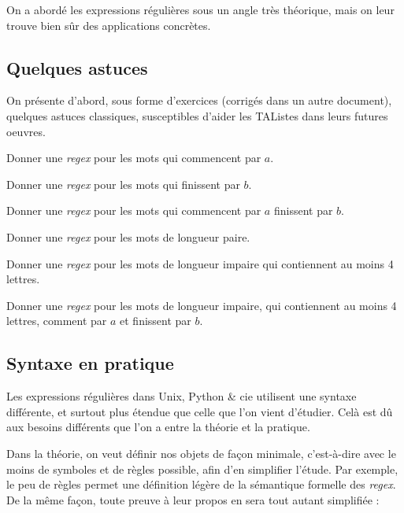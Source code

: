On a abordé les expressions régulières sous un angle très théorique, mais on leur trouve bien sûr des applications concrètes.

\subsection{Quelques astuces}

On présente d'abord, sous forme d'exercices (corrigés dans un autre document), quelques astuces classiques, susceptibles d'aider les TAListes dans leurs futures oeuvres. 

\begin{exercice}
Donner une \textit{regex} pour les mots qui commencent par $a$.
\end{exercice}

\begin{exercice}
Donner une \textit{regex} pour les mots qui finissent par $b$.
\end{exercice}

\begin{exercice}
Donner une \textit{regex} pour les mots qui commencent par $a$ finissent par $b$.
\end{exercice}


\begin{exercice}
Donner une \textit{regex} pour les mots de longueur paire.
\end{exercice}

\begin{exercice}
Donner une \textit{regex} pour les mots de longueur impaire qui contiennent au moins 4 lettres.
\end{exercice}

\begin{exercice}
Donner une \textit{regex} pour les mots de longueur impaire, qui contiennent au moins 4 lettres, comment par $a$ et finissent par $b$.
\end{exercice}


\subsection{Syntaxe en pratique}

Les expressions régulières dans Unix, Python \& cie utilisent une syntaxe différente, et surtout plus étendue que celle que l'on vient d'étudier. Celà est dû aux besoins différents que l'on a entre la théorie et la pratique. 

Dans la théorie, on veut définir nos objets de façon minimale, c'est-à-dire avec le moins de symboles et de règles possible, afin d'en simplifier l'étude. Par exemple, le peu de règles permet une définition légère de la sémantique formelle des \textit{regex}. De la même façon, toute preuve à leur propos en sera tout autant simplifiée :

